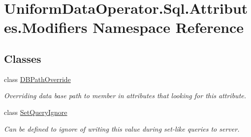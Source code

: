 \hypertarget{namespace_uniform_data_operator_1_1_sql_1_1_attributes_1_1_modifiers}{}\section{Uniform\+Data\+Operator.\+Sql.\+Attributes.\+Modifiers Namespace Reference}
\label{namespace_uniform_data_operator_1_1_sql_1_1_attributes_1_1_modifiers}
\subsection*{Classes}
\begin{DoxyCompactItemize}
\item 
class \mbox{\hyperlink{class_uniform_data_operator_1_1_sql_1_1_attributes_1_1_modifiers_1_1_d_b_path_override}{D\+B\+Path\+Override}}
\begin{DoxyCompactList}\small\item\em Overriding data base path to member in attributes that looking for this attribute. \end{DoxyCompactList}\item 
class \mbox{\hyperlink{class_uniform_data_operator_1_1_sql_1_1_attributes_1_1_modifiers_1_1_set_query_ignore}{Set\+Query\+Ignore}}
\begin{DoxyCompactList}\small\item\em Can be defined to ignore of writing this value during set-\/like queries to server. \end{DoxyCompactList}\end{DoxyCompactItemize}
